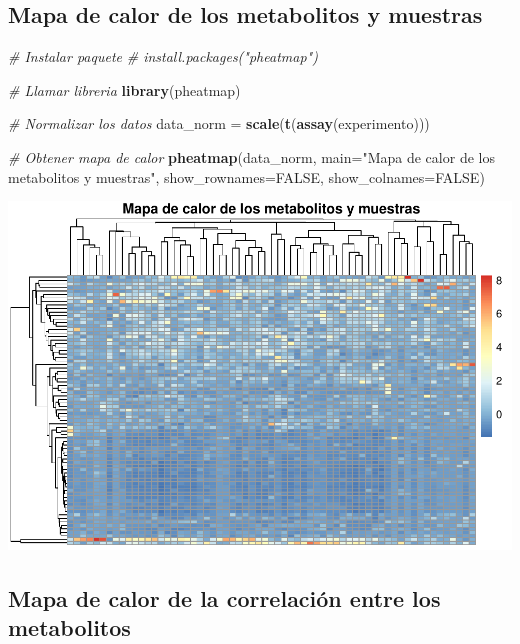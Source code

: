 \documentclass[
]{article}
\newenvironment{Shaded}{\begin{snugshade}}{\end{snugshade}}
\newcommand{\AttributeTok}[1]{\textcolor[rgb]{0.13,0.29,0.53}{#1}}
\newcommand{\CommentTok}[1]{\textcolor[rgb]{0.56,0.35,0.01}{\textit{#1}}}
\newcommand{\ConstantTok}[1]{\textcolor[rgb]{0.56,0.35,0.01}{#1}}
\newcommand{\FunctionTok}[1]{\textcolor[rgb]{0.13,0.29,0.53}{\textbf{#1}}}
\newcommand{\NormalTok}[1]{#1}
\newcommand{\OtherTok}[1]{\textcolor[rgb]{0.56,0.35,0.01}{#1}}
\newcommand{\StringTok}[1]{\textcolor[rgb]{0.31,0.60,0.02}{#1}}
\begin{document}
\subsection{Mapa de calor de los metabolitos y
muestras}\label{mapa-de-calor-de-los-metabolitos-y-muestras}

\begin{Shaded}
\begin{Highlighting}[]
\CommentTok{\# Instalar paquete}
\CommentTok{\# install.packages("pheatmap")}

\CommentTok{\# Llamar libreria}
\FunctionTok{library}\NormalTok{(pheatmap)}

\CommentTok{\# Normalizar los datos}
\NormalTok{data\_norm }\OtherTok{=} \FunctionTok{scale}\NormalTok{(}\FunctionTok{t}\NormalTok{(}\FunctionTok{assay}\NormalTok{(experimento)))}

\CommentTok{\# Obtener mapa de calor}
\FunctionTok{pheatmap}\NormalTok{(data\_norm, }\AttributeTok{main=}\StringTok{"Mapa de calor de los metabolitos y muestras"}\NormalTok{, }\AttributeTok{show\_rownames=}\ConstantTok{FALSE}\NormalTok{, }\AttributeTok{show\_colnames=}\ConstantTok{FALSE}\NormalTok{)}
\end{Highlighting}
\end{Shaded}

\includegraphics{PEC1_files/figure-latex/unnamed-chunk-9-1.pdf}

\subsection{Mapa de calor de la correlación entre los
metabolitos}\label{mapa-de-calor-de-la-correlaciuxf3n-entre-los-metabolitos}
\end{document}

